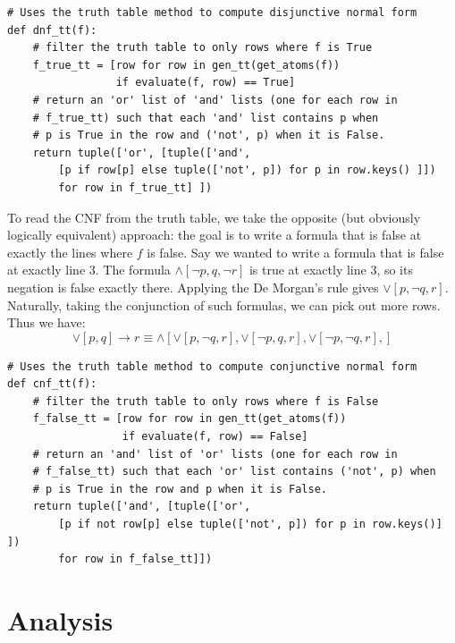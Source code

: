 \documentclass[a4paper,notitlepage]{scrartcl}
\begin{document}
\begin{verbatim}
# Uses the truth table method to compute disjunctive normal form
def dnf_tt(f):
    # filter the truth table to only rows where f is True
    f_true_tt = [row for row in gen_tt(get_atoms(f)) 
                 if evaluate(f, row) == True]
    # return an 'or' list of 'and' lists (one for each row in
    # f_true_tt) such that each 'and' list contains p when
    # p is True in the row and ('not', p) when it is False.
    return tuple(['or', [tuple(['and', 
        [p if row[p] else tuple(['not', p]) for p in row.keys() ]]) 
        for row in f_true_tt] ])
\end{verbatim}

To read the CNF from the truth table, we take the opposite (but obviously
        logically equivalent) approach: the goal is to write a formula
        that is false at exactly the lines where $f$ is false. 
Say we wanted to write a formula that is false at exactly line $3$.
The formula $\land[\lnot p, q, \lnot r]$ is true at exactly line $3$, so its
        negation is false exactly there.
Applying the De Morgan's rule gives $\lor[p, \lnot q, r]$.
Naturally, taking the conjunction of such formulas, we can pick out more rows.
Thus we have:
\[
\lor[p,q]\rightarrow r \equiv 
\land[
\lor[p, \lnot q, r], 
\lor[\lnot p, q, r], 
\lor[\lnot p, \lnot q, r], 
     ]
\]

\begin{verbatim}
# Uses the truth table method to compute conjunctive normal form
def cnf_tt(f):
    # filter the truth table to only rows where f is False 
    f_false_tt = [row for row in gen_tt(get_atoms(f)) 
                  if evaluate(f, row) == False]
    # return an 'and' list of 'or' lists (one for each row in
    # f_false_tt) such that each 'or' list contains ('not', p) when
    # p is True in the row and p when it is False.
    return tuple(['and', [tuple(['or', 
        [p if not row[p] else tuple(['not', p]) for p in row.keys()] ]) 
        for row in f_false_tt]])
\end{verbatim}

\section{Analysis}
\end{document}
